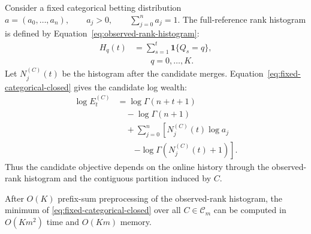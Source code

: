 Consider a fixed categorical betting distribution
\(a=(a_0,\ldots,a_n), \qquad a_j>0,\qquad \sum_{j=0}^n a_j=1.\)
The full-reference rank histogram is defined by Equation~\eqref{eq:observed-rank-histogram}:
\begin{equation}
\begin{aligned}
H_q(t)&=\sum_{s=1}^t\mathbf 1\{Q_s=q\},\\
&\qquad q=0,\ldots,K.
\end{aligned}
\label{eq:observed-rank-histogram}
\end{equation}
Let \(N_j^{(C)}(t)\) be the histogram after the candidate merges. Equation~\eqref{eq:fixed-categorical-closed} gives the candidate log wealth:
\begin{align}
  \log E_t^{(C)}
  &=
  \log\Gamma(n+t+1) \nonumber\\
  &\quad-\log\Gamma(n+1) \nonumber\\
  &\quad+
  \sum_{j=0}^n
  \left[
    N_j^{(C)}(t)\log a_j
    \right. \nonumber\\
  &\qquad\left.
    -
    \log\Gamma(N_j^{(C)}(t)+1)
  \right].
  \label{eq:fixed-categorical-closed}
\end{align}
Thus the candidate objective depends on the online history through the observed-rank histogram and the contiguous partition induced by \(C\).

\begin{theorem}
After \(O(K)\) prefix-sum preprocessing of the observed-rank histogram, the minimum of \eqref{eq:fixed-categorical-closed} over all \(C\in\mathcal C_m\) can be computed in
\(O(Km^2)\)
time and
\(O(Km)\)
memory.
\end{theorem}

